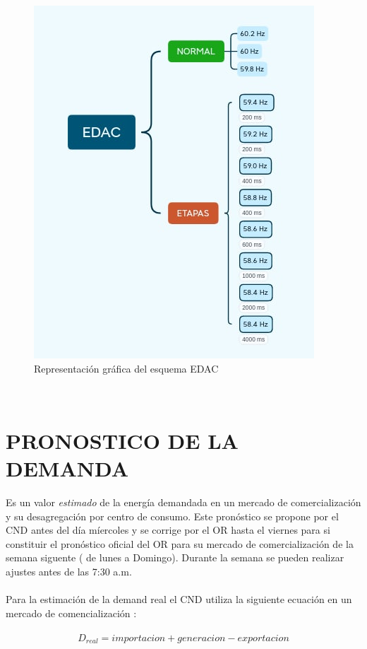 \documentclass[a5paper]{book}%
\begin{document}
\begin{figure}[H]
  \centering
  \caption{Representación gráfica del esquema EDAC}
  \label{fig:edac2}
  \includegraphics[width=0.8\linewidth]{EDAC}
\end{figure}


\

\chapter{PRONOSTICO DE LA DEMANDA}

Es un valor \textit{estimado} de la energía demandada en un mercado de
comercialización y su desagregación por centro de consumo. Este
pronóstico se propone por el CND antes del día míercoles y se corrige
por el OR hasta el viernes para si constituir el pronóstico oficial
del OR para su mercado de comercialización de la semana siguente ( de
lunes a Domingo). Durante la semana se pueden realizar ajustes antes
de las 7:30 a.m.\\\\
Para la estimación de la demand real el CND utiliza la siguiente
ecuación en un mercado de comencialización :\\\\
\[D_{real} = importacion + generacion - exportacion \]
\end{document}

